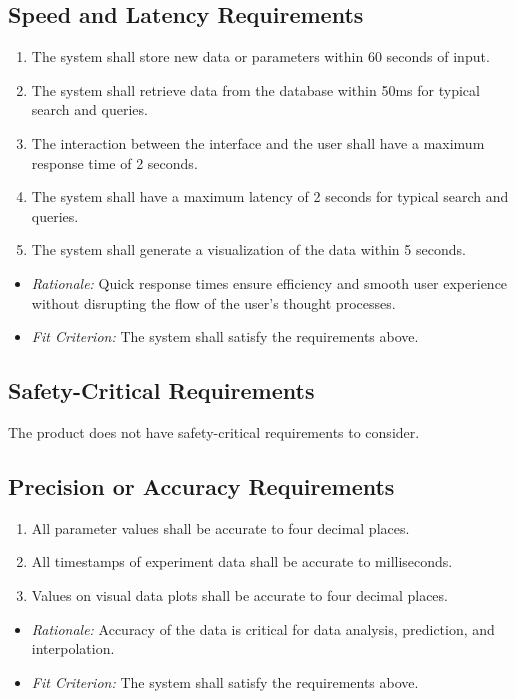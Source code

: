 \documentclass[12pt]{article}
\begin{document}
\subsection{Speed and Latency Requirements}
\begin{enumerate}
\item The system shall store new data or parameters within 60 seconds of input.
\item The system shall retrieve data from the database within 50ms for typical search and queries.
\item The interaction between the interface and the user shall have a maximum response time of 2 seconds.
\item The system shall have a maximum latency of 2 seconds for typical search and queries.
\item The system shall generate a visualization of the data within 5 seconds.
\end{enumerate}
\begin{itemize}
  \item \textit{Rationale:} Quick response times ensure efficiency and smooth user experience without disrupting the flow of the user's thought processes.
  \item \textit{Fit Criterion:} The system shall satisfy the requirements above.
\end{itemize}

\subsection{Safety-Critical Requirements}
The product does not have safety-critical requirements to consider.

\subsection{Precision or Accuracy Requirements}
\begin{enumerate}
  \item All parameter values shall be accurate to four decimal places.
  \item All timestamps of experiment data shall be accurate to milliseconds. 
  \item Values on visual data plots shall be accurate to four decimal places.
\end{enumerate}
\begin{itemize}
  \item \textit{Rationale:} Accuracy of the data is critical for data analysis, prediction, and interpolation.
  \item \textit{Fit Criterion:} The system shall satisfy the requirements above.
\end{itemize}
\end{document}
